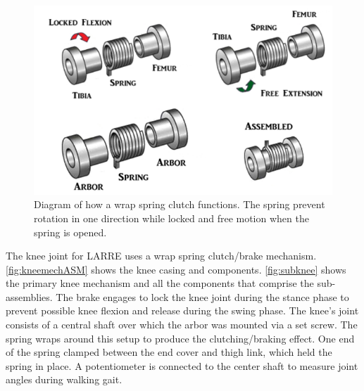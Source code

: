 \begin{figure}
    \centering
    \includegraphics[scale=0.45]{images/mech_design/wrapspringclutch.png}
    \caption[Wrap Spring Clutch]{Diagram of how a wrap spring clutch functions. The spring prevent rotation in one direction while locked and free motion when the spring is opened. \cite{irby1999optimization}}
    \label{fig:WrapSpringClutch}
\end{figure}


The knee joint for LARRE uses a wrap spring clutch/brake mechanism. \autoref{fig:kneemechASM} shows the knee casing and components.  \autoref{fig:subknee} shows the primary knee mechanism and all the components that comprise the sub-assemblies. The brake engages to lock the knee joint during the stance phase to prevent possible knee flexion and release during the swing phase. The knee's joint consists of a central shaft over which the arbor was mounted via a set screw. The spring wraps around this setup to produce the clutching/braking effect. One end of the spring clamped between the end cover and thigh link, which held the spring in place. A potentiometer is connected to the center shaft to measure joint angles during walking gait.



